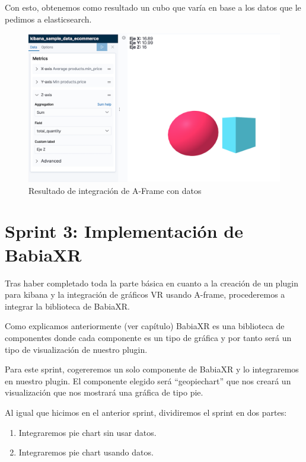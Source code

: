 \documentclass[a4paper, 12pt]{book}
\begin{document}
Con esto, obtenemos como resultado un cubo que varía en base a los datos que le pedimos a elasticsearch.

\begin{figure}[H]
  \centering
  \includegraphics[width=16cm, keepaspectratio]{img/development/box_with_data.png}
  \caption{Resultado de integración de A-Frame con datos}
  \label{fig:boxwithdata}
\end{figure}



\section{Sprint 3: Implementación de BabiaXR }
\label{sec:sprint3}

Tras haber completado toda la parte básica en cuanto a la creación de un plugin para kibana y la integración de gráficos VR usando A-frame, procederemos a integrar la biblioteca de BabiaXR. 

Como explicamos anteriormente (ver capítulo) BabiaXR es una biblioteca de componentes donde cada componente es un tipo de gráfica y por tanto será un tipo de visualización de nuestro plugin.

Para este sprint, cogereremos un solo componente de BabiaXR y lo integraremos en nuestro plugin. El componente elegido será “geopiechart” que nos creará un visualización que nos mostrará una gráfica de tipo pie. 

Al igual que hicimos en el anterior sprint, dividiremos el sprint en dos partes:

\begin{enumerate}
    \item Integraremos pie chart sin usar datos.
    \item Integraremos pie chart usando datos.
\end{enumerate}
\end{document}
